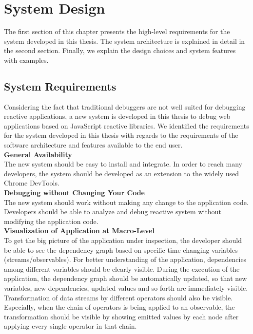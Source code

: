 \chapter{System Design} \label{chap:System Design}
The first section of this chapter presents the high-level requirements for the system developed in this thesis. The system architecture is explained in detail in the second section. Finally, we explain the design choices and system features with examples.

\section{System Requirements}
Considering the fact that traditional debuggers are not well suited for debugging reactive applications, a new system is developed in this thesis to debug web applications based on JavaScript reactive libraries. We identified the requirements for the system developed in this thesis with regards to the requirements of the software architecture and features available to the end user.\\


\textbf{General Availability} 
\\
The new system should be easy to install and integrate. In order to reach many developers, the system should be developed as an extension to the widely used Chrome DevTools.\\


\textbf{Debugging without Changing Your Code}
\\
The new system should work without making any change to the application code. Developers should be able to analyze and debug reactive system without modifying the application code.\\


\textbf{Visualization of Application at Macro-Level}
\\
To get the big picture of the application under inspection, the developer should be able to see the dependency graph based on specific time-changing variables (streams/observables). For better understanding of the application, dependencies among different variables should be clearly visible. During the execution of the application, the dependency graph should be automatically updated, so that new variables,
new dependencies, updated values and so forth are immediately visible. Transformation of data streams by different operators should also be visible. Especially, when the chain of operators is being applied to an observable, the transformation should be visible by showing emitted values by each node after applying every single operator in that chain.\\


